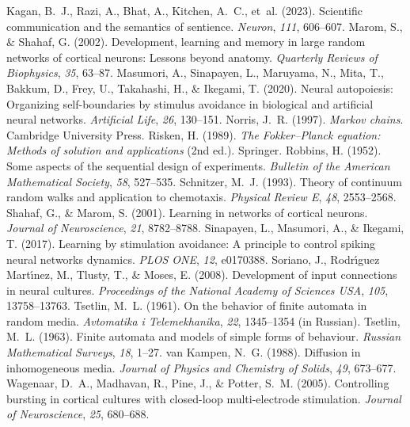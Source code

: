 \documentclass[12pt]{article}
\numberwithin{equation}{section}
\begin{document}
\begin{thebibliography}{}
 Kagan, B.~J., Razi, A., Bhat, A., Kitchen, A.~C., et~al. (2023). Scientific communication and the semantics of sentience. \emph{Neuron}, \emph{111}, 606--607.
 Marom, S., \& Shahaf, G. (2002). Development, learning and memory in large random networks of cortical neurons: Lessons beyond anatomy. \emph{Quarterly Reviews of Biophysics}, \emph{35}, 63--87.
 Masumori, A., Sinapayen, L., Maruyama, N., Mita, T., Bakkum, D., Frey, U., Takahashi, H., \& Ikegami, T. (2020). Neural autopoiesis: Organizing self-boundaries by stimulus avoidance in biological and artificial neural networks. \emph{Artificial Life}, \emph{26}, 130--151.
 Norris, J.~R. (1997). \emph{Markov chains}. Cambridge University Press.
 Risken, H. (1989). \emph{The Fokker--Planck equation: Methods of solution and applications} (2nd ed.). Springer.
 Robbins, H. (1952). Some aspects of the sequential design of experiments. \emph{Bulletin of the American Mathematical Society}, \emph{58}, 527--535.
 Schnitzer, M.~J. (1993). Theory of continuum random walks and application to chemotaxis. \emph{Physical Review E}, \emph{48}, 2553--2568.
 Shahaf, G., \& Marom, S. (2001). Learning in networks of cortical neurons. \emph{Journal of Neuroscience}, \emph{21}, 8782--8788.
 Sinapayen, L., Masumori, A., \& Ikegami, T. (2017). Learning by stimulation avoidance: A principle to control spiking neural networks dynamics. \emph{PLOS ONE}, \emph{12}, e0170388.
 Soriano, J., Rodr\'{\i}guez Mart\'{\i}nez, M., Tlusty, T., \& Moses, E. (2008). Development of input connections in neural cultures. \emph{Proceedings of the National Academy of Sciences USA}, \emph{105}, 13758--13763.
 Tsetlin, M.~L. (1961). On the behavior of finite automata in random media. \emph{Avtomatika i Telemekhanika}, \emph{22}, 1345--1354 (in Russian).
 Tsetlin, M.~L. (1963). Finite automata and models of simple forms of behaviour. \emph{Russian Mathematical Surveys}, \emph{18}, 1--27.
 van Kampen, N.~G. (1988). Diffusion in inhomogeneous media. \emph{Journal of Physics and Chemistry of Solids}, \emph{49}, 673--677.
 Wagenaar, D.~A., Madhavan, R., Pine, J., \& Potter, S.~M. (2005). Controlling bursting in cortical cultures with closed-loop multi-electrode stimulation. \emph{Journal of Neuroscience}, \emph{25}, 680--688.
\end{thebibliography}
\end{document}

